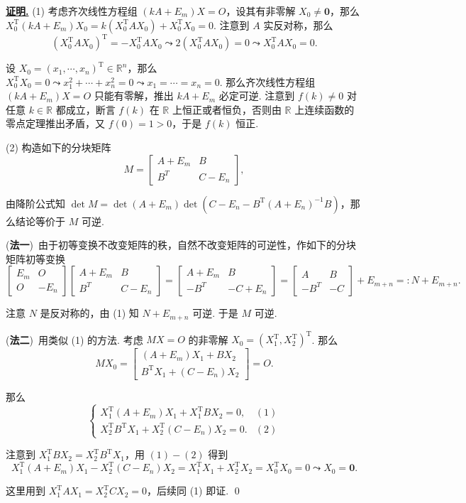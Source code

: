 \documentclass[10pt,openany]{article}
\theoremstyle{thmstyle} %
\theoremstyle{defstyle} %
\theoremstyle{prostyle} %
\theoremstyle{exastyle}
\theoremstyle{remstyle}
\renewenvironment{proof}[1][证明]{\par\underline{\textbf{#1.}} \;\fangsong}{\qed\par}
\newcommand{\T}{^{\text{T}}}
\newcommand{\R}{\mathbb{R}}
\begin{document}
\begin{proof}
	(1) 考虑齐次线性方程组 \( (kA+E_m)X=O \)，设其有非零解 \( X_0 \neq \bm{0} \)，那么 \( X_0\T (kA+E_m) X_0= k (X_0\T A X_0)+ X_0\T X_0=0 \). 注意到 \( A \) 实反对称，那么 
	\[ (X_0\T A X_0)\T= -X_0\T A X_0 \leadsto 2(X_0\T A X_0)=0 \leadsto X_0\T A X_0=0.\]
	
	设 \( X_0=(x_1,\cdots,x_n)\T \in \R^n \)，那么 \( X_0\T X_0=0 \leadsto x_1^2+\cdots+x_n^2=0 \leadsto x_1=\cdots=x_n=0 \). 那么齐次线性方程组 \( (kA+E_m)X=O \) 只能有零解，推出 \( kA+E_m \) 必定可逆. 注意到 \( f(k) \neq 0 \) 对任意 \( k \in \R \) 都成立，断言 \( f(k) \) 在 \( \R \) 上恒正或者恒负，否则由 \( \R \) 上连续函数的零点定理推出矛盾，又 \( f(0)=1>0 \)，于是 \( f(k) \) 恒正.
	
	(2) 构造如下的分块矩阵
	\[ M=\begin{bmatrix}
		A+E_m & B \\
		B^T & C-E_n
	\end{bmatrix}, \]
	
	由降阶公式知 \( \det M= \det (A+E_m) \det (C-E_n-B\T(A+E_n)^{-1}B) \)，那么结论等价于 \( M \) 可逆.
	
	(\textbf{法一})\ 由于初等变换不改变矩阵的秩，自然不改变矩阵的可逆性，作如下的分块矩阵初等变换
	\[ \begin{bmatrix}
		E_m & O \\
		O & -E_n
	\end{bmatrix}\begin{bmatrix}
	A+E_m & B \\
	B^T & C-E_n
	\end{bmatrix}=\begin{bmatrix}
	A+E_m & B \\
	-B^T & -C+E_n
	\end{bmatrix}=\begin{bmatrix}
	A & B \\
	-B^T & -C
	\end{bmatrix}+E_{m+n}=:N+E_{m+n}. \]
	
	注意 \( N \) 是反对称的，由 (1) 知 \( N+E_{m+n} \) 可逆. 于是 \( M \) 可逆.
	
	\vspace{1ex}
	
	(\textbf{法二})\ 用类似 (1) 的方法. 考虑 \( MX=O \) 的非零解 \( X_0=(X_1\T,X_2\T)\T \). 那么
	\[ MX_0= \begin{bmatrix}
		(A+E_m)X_1+BX_2 \\
		B\T X_1+(C-E_n)X_2
	\end{bmatrix}=O. \]
	
	那么
	\[ \left\{ \begin{array}{lc}
		X_1\T (A+E_m)X_1+ X_1\T BX_2=0, & (1) \\
		X_2\T B\T X_1+ X_2\T (C-E_n)X_2=0.  & (2)
	\end{array}\right. \]
	
	注意到 \( X_1\T BX_2=X_2\T B\T X_1 \)，用 \( (1)-(2) \) 得到
	\[ X_1\T (A+E_m)X_1-X_2\T (C-E_n)X_2=X_1\T X_1+X_2\T X_2=X_0\T X_0=0 \leadsto X_0=\bm{0}. \]
	
	这里用到 \( X_1\T AX_1=X_2\T CX_2=0 \)，后续同 (1) 即证.
\end{proof}
\end{document}
